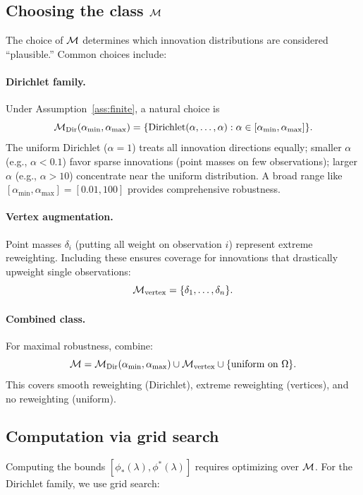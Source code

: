 \documentclass{article}
\begin{document}
\subsection{Choosing the class $\mathcal{M}$}

The choice of $\mathcal{M}$ determines which innovation distributions are considered ``plausible.'' Common choices include:

\paragraph{Dirichlet family.}
Under Assumption~\ref{ass:finite}, a natural choice is
\[
    \mathcal{M}_{\text{Dir}}(\alpha_{\min}, \alpha_{\max}) = \{\text{Dirichlet}(\alpha, \ldots, \alpha) : \alpha \in [\alpha_{\min}, \alpha_{\max}]\}.
\]
The uniform Dirichlet ($\alpha = 1$) treats all innovation directions equally; smaller $\alpha$ (e.g., $\alpha < 0.1$) favor sparse innovations (point masses on few observations); larger $\alpha$ (e.g., $\alpha > 10$) concentrate near the uniform distribution. A broad range like $[\alpha_{\min}, \alpha_{\max}] = [0.01, 100]$ provides comprehensive robustness.

\paragraph{Vertex augmentation.}
Point masses $\delta_i$ (putting all weight on observation $i$) represent extreme reweighting. Including these ensures coverage for innovations that drastically upweight single observations:
\[
    \mathcal{M}_{\text{vertex}} = \{\delta_1, \ldots, \delta_n\}.
\]

\paragraph{Combined class.}
For maximal robustness, combine:
\[
    \mathcal{M} = \mathcal{M}_{\text{Dir}}(\alpha_{\min}, \alpha_{\max}) \cup \mathcal{M}_{\text{vertex}} \cup \{\text{uniform on } \Omega\}.
\]
This covers smooth reweighting (Dirichlet), extreme reweighting (vertices), and no reweighting (uniform).

\subsection{Computation via grid search}

Computing the bounds $[\phi_*(\lambda), \phi^*(\lambda)]$ requires optimizing over $\mathcal{M}$. For the Dirichlet family, we use grid search:
\end{document}
